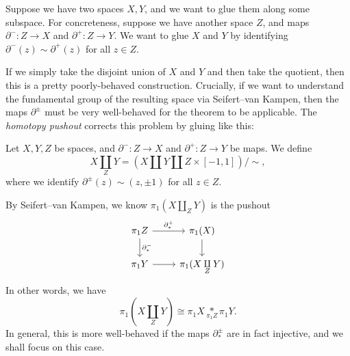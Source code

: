 \documentclass[a4paper]{article}
\begin{document}
Suppose we have two spaces $X, Y$, and we want to glue them along some subspace. For concreteness, suppose we have another space $Z$, and maps $\partial^-: Z \to X$ and $\partial^+: Z \to Y$. We want to glue $X$ and $Y$ by identifying $\partial^-(z) \sim \partial^+(z)$ for all $z \in Z$.

If we simply take the disjoint union of $X$ and $Y$ and then take the quotient, then this is a pretty poorly-behaved construction. Crucially, if we want to understand the fundamental group of the resulting space via Seifert--van Kampen, then the maps $\partial^{\pm}$ must be very well-behaved for the theorem to be applicable. The \emph{homotopy pushout} corrects this problem by gluing like this:
\begin{center}
\end{center}

\begin{defi}
  Let $X, Y, Z$ be spaces, and $\partial^-: Z \to X$ and $\partial^+: Z \to Y$ be maps. We define
  \[
    X \underset{Z}{\amalg} Y = (X \amalg Y \amalg Z \times [-1, 1])/\sim,
  \]
  where we identify $\partial^{\pm}(z)\sim (z, \pm 1)$ for all $z \in Z$.
\end{defi}
By Seifert--van Kampen, we know $\pi_1(X\underset{Z}{\amalg} Y)$ is the pushout
\[
  \begin{tikzcd}
    \pi_1Z \ar[r, "\partial^+_*"] \ar[d, "\partial^-_*"] & \pi_1(X) \ar[d]\\
    \pi_1 Y \ar[r] & \pi_1(X \underset{Z}{\amalg} Y)
  \end{tikzcd}
\]
In other words, we have
\[
  \pi_1(X \underset{Z}{\amalg} Y) \cong \pi_1 X \underset{\pi_1 Z}{*} \pi_1 Y.
\]
In general, this is more well-behaved if the maps $\partial_*^{\pm}$ are in fact injective, and we shall focus on this case.
\end{document}
